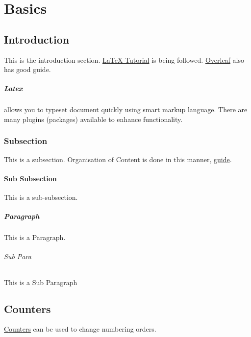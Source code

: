 \documentclass{report}[a4paper,12pt] %
\begin{document}
  \maketitle %
  \newpage %
  \tableofcontents

\chapter{Basics} %
\section{Introduction}
This is the introduction section.
\href{http://www.latex-tutorial.com}{LaTeX-Tutorial} is being followed.
\href{https://www.overleaf.com/learn}{Overleaf} also has good guide.

\paragraph*{Latex} allows you to typeset document quickly using smart markup language.
There are many plugins (packages) available to enhance functionality.

\subsection{Subsection}
This is a subsection.  
Organisation of Content is done in this manner, \href{https://www.overleaf.com/learn/latex/Sections_and_chapters}{guide}.

\subsubsection{Sub Subsection}
This is a sub-subsection.

\paragraph{Paragraph} 
This is a Paragraph.

\subparagraph{Sub Para}
This is a Sub Paragraph

\section{Counters}
\href{https://www.overleaf.com/learn/latex/Counters}{Counters} can be used to change numbering orders.
\end{document}
